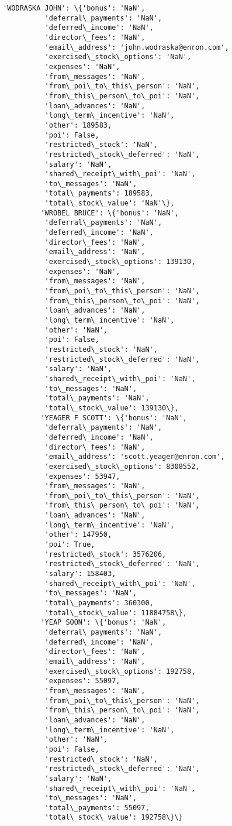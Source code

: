 \documentclass[11pt]{article}
\begin{document}
\begin{Verbatim}[commandchars=\\\{\}]
         'WODRASKA JOHN': \{'bonus': 'NaN',
          'deferral\_payments': 'NaN',
          'deferred\_income': 'NaN',
          'director\_fees': 'NaN',
          'email\_address': 'john.wodraska@enron.com',
          'exercised\_stock\_options': 'NaN',
          'expenses': 'NaN',
          'from\_messages': 'NaN',
          'from\_poi\_to\_this\_person': 'NaN',
          'from\_this\_person\_to\_poi': 'NaN',
          'loan\_advances': 'NaN',
          'long\_term\_incentive': 'NaN',
          'other': 189583,
          'poi': False,
          'restricted\_stock': 'NaN',
          'restricted\_stock\_deferred': 'NaN',
          'salary': 'NaN',
          'shared\_receipt\_with\_poi': 'NaN',
          'to\_messages': 'NaN',
          'total\_payments': 189583,
          'total\_stock\_value': 'NaN'\},
         'WROBEL BRUCE': \{'bonus': 'NaN',
          'deferral\_payments': 'NaN',
          'deferred\_income': 'NaN',
          'director\_fees': 'NaN',
          'email\_address': 'NaN',
          'exercised\_stock\_options': 139130,
          'expenses': 'NaN',
          'from\_messages': 'NaN',
          'from\_poi\_to\_this\_person': 'NaN',
          'from\_this\_person\_to\_poi': 'NaN',
          'loan\_advances': 'NaN',
          'long\_term\_incentive': 'NaN',
          'other': 'NaN',
          'poi': False,
          'restricted\_stock': 'NaN',
          'restricted\_stock\_deferred': 'NaN',
          'salary': 'NaN',
          'shared\_receipt\_with\_poi': 'NaN',
          'to\_messages': 'NaN',
          'total\_payments': 'NaN',
          'total\_stock\_value': 139130\},
         'YEAGER F SCOTT': \{'bonus': 'NaN',
          'deferral\_payments': 'NaN',
          'deferred\_income': 'NaN',
          'director\_fees': 'NaN',
          'email\_address': 'scott.yeager@enron.com',
          'exercised\_stock\_options': 8308552,
          'expenses': 53947,
          'from\_messages': 'NaN',
          'from\_poi\_to\_this\_person': 'NaN',
          'from\_this\_person\_to\_poi': 'NaN',
          'loan\_advances': 'NaN',
          'long\_term\_incentive': 'NaN',
          'other': 147950,
          'poi': True,
          'restricted\_stock': 3576206,
          'restricted\_stock\_deferred': 'NaN',
          'salary': 158403,
          'shared\_receipt\_with\_poi': 'NaN',
          'to\_messages': 'NaN',
          'total\_payments': 360300,
          'total\_stock\_value': 11884758\},
         'YEAP SOON': \{'bonus': 'NaN',
          'deferral\_payments': 'NaN',
          'deferred\_income': 'NaN',
          'director\_fees': 'NaN',
          'email\_address': 'NaN',
          'exercised\_stock\_options': 192758,
          'expenses': 55097,
          'from\_messages': 'NaN',
          'from\_poi\_to\_this\_person': 'NaN',
          'from\_this\_person\_to\_poi': 'NaN',
          'loan\_advances': 'NaN',
          'long\_term\_incentive': 'NaN',
          'other': 'NaN',
          'poi': False,
          'restricted\_stock': 'NaN',
          'restricted\_stock\_deferred': 'NaN',
          'salary': 'NaN',
          'shared\_receipt\_with\_poi': 'NaN',
          'to\_messages': 'NaN',
          'total\_payments': 55097,
          'total\_stock\_value': 192758\}\}
\end{Verbatim}
            
\end{document}

